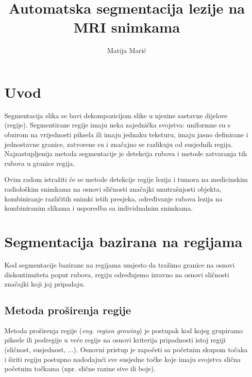 \documentclass[lmodern, utf8, seminar]{fer}
\begin{document}
\nocite{*}

\title{Automatska segmentacija lezije na MRI snimkama}

\author{Matija Marić}

\maketitle

\tableofcontents

\chapter{Uvod}

Segmentacija slika se bavi dekompozicijom slike u njezine sastavne dijelove (regije). Segmentirane regije imaju neka zajednička svojstva: uniformne su s obzirom na vrijednosti piksela ili imaju jednaku teksturu, imaju jasno definirane i jednostavne granice, zatvorene su i značajno se razlikuju od susjednih regija.
Najzastupljenija metoda segmentacije je detekcija rubova i metode zatvaranja tih rubova u granice regija.

Ovim radom istražiti će se metode detekcije regije lezija i tumora na medicinskim radiološkim snimkama na osnovi sličnosti značajki unutrašnjosti objekta, kombiniranje različitih snimki istih presjeka, određivanje rubova lezija na kombiniranim slikama i usporedba sa individualnim snimkama.

\chapter{Segmentacija bazirana na regijama}

Kod segmentacije bazirane na regijama umjesto da tražimo granice na osnovi diskontinuiteta poput rubova, regiju određujemo izravno na osnovi sličnosti značajki koji joj pripadaju.

\section{Metoda proširenja regije}

Metoda proširenja regije ({\it eng. region growing}) je postupak kod kojeg grupiramo piksele ili podregije u veće regije na osnovi kriterija pripadnosti istoj regiji (sličnost, susjednost, ...). Osnovni pristup je započeti sa početnim skupom točaka i širiti regiju postupno nadodajući sve susjedne točke koje imaju svojstva slična početnim točkama (npr. slične razine sive ili boje).
\end{document}
